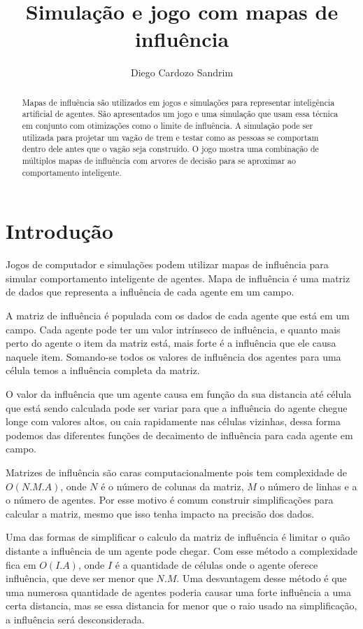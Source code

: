 \documentclass[a4paper]{article}
\title{Simulação e jogo com mapas de influência}
\author{Diego Cardozo Sandrim}
\begin{document}
\maketitle

\begin{abstract}
Mapas de influência são utilizados em jogos e simulações para representar inteligência artificial de agentes. São apresentados um jogo e uma simulação que usam essa técnica em conjunto com otimizações como o limite de influência. A simulação pode ser utilizada para projetar um vagão de trem e testar como as pessoas se comportam dentro dele antes que o vagão seja construído. O jogo mostra uma combinação de múltiplos mapas de influência com arvores de decisão para se aproximar ao comportamento inteligente.
\end{abstract}

\section{Introdução}

Jogos de computador e simulações podem utilizar mapas de influência para simular comportamento inteligente de agentes. Mapa de influência é uma matriz de dados que representa a influência de cada agente em um campo. \cite{Millington:2009:AIG:1795711}

A matriz de influência é populada com os dados de cada agente que está em um campo. Cada agente pode ter um valor intrínseco de influência, e quanto mais perto do agente o item da matriz está, mais forte é a influência que ele causa naquele item. Somando-se todos os valores de influência dos agentes para uma célula temos a influência completa da matriz.

O valor da influência que um agente causa em função da sua distancia até célula que está sendo calculada pode ser variar para que a influência do agente chegue longe com valores altos, ou caia rapidamente nas células vizinhas, dessa forma podemos das diferentes funções de decaimento de influência para cada agente em campo.

Matrizes de influência são caras computacionalmente pois tem complexidade de $O(N.M.A)$, onde $N$ é o número de colunas da matriz, $M$ o número de linhas e a o número de agentes. Por esse motivo é comum construir simplificações para calcular a matriz, mesmo que isso tenha impacto na precisão dos dados.

Uma das formas de simplificar o calculo da matriz de influência é limitar o quão distante a influência de um agente pode chegar. Com esse método a complexidade fica em $O(I.A)$, onde $I$ é a quantidade de células onde o agente oferece influência, que deve ser menor que $N.M$. Uma desvantagem desse método é que uma numerosa quantidade de agentes poderia causar uma forte influência a uma certa distancia, mas se essa distancia for menor que o raio usado na simplificação, a influência será desconsiderada.
\end{document}
